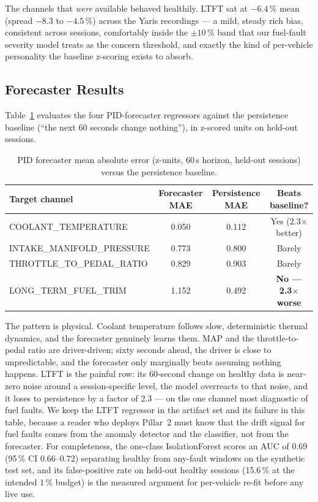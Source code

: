 The channels that \emph{were} available behaved healthily. LTFT sat at
$-6.4\,\%$ mean (spread $-8.3$ to $-4.5\,\%$) across the Yaris recordings
--- a mild, steady rich bias, consistent across sessions, comfortably
inside the $\pm10\,\%$ band that our fuel-fault severity model treats as
the concern threshold, and exactly the kind of per-vehicle personality the
baseline z-scoring exists to absorb.

\subsection{Forecaster Results}
\label{sec:forecastresults}

Table~\ref{tab:forecaster} evaluates the four PID-forecaster regressors
against the persistence baseline (``the next 60 seconds change nothing''),
in z-scored units on held-out sessions.

\begin{table}[H]
  \centering
  \caption{PID forecaster mean absolute error (z-units, 60\,s horizon,
    held-out sessions) versus the persistence baseline.}
  \label{tab:forecaster}
  \begin{tabular}{lccc}
    \toprule
    Target channel & Forecaster MAE & Persistence MAE & Beats baseline?\\
    \midrule
    COOLANT\_TEMPERATURE      & 0.050 & 0.112 & Yes (2.3$\times$ better)\\
    INTAKE\_MANIFOLD\_PRESSURE & 0.773 & 0.800 & Barely\\
    THROTTLE\_TO\_PEDAL\_RATIO & 0.829 & 0.903 & Barely\\
    LONG\_TERM\_FUEL\_TRIM     & 1.152 & 0.492 & \textbf{No --- 2.3$\times$ worse}\\
    \bottomrule
  \end{tabular}
\end{table}

The pattern is physical. Coolant temperature follows slow, deterministic
thermal dynamics, and the forecaster genuinely learns them. MAP and the
throttle-to-pedal ratio are driver-driven; sixty seconds ahead, the driver
is close to unpredictable, and the forecaster only marginally beats
assuming nothing happens. LTFT is the painful row: its 60-second change on
healthy data is near-zero noise around a session-specific level, the model
overreacts to that noise, and it loses to persistence by a factor of 2.3
--- on the one channel most diagnostic of fuel faults. We keep the LTFT
regressor in the artifact set and its failure in this table, because a
reader who deploys Pillar~2 must know that the drift signal for fuel
faults comes from the anomaly detector and the classifier, not from the
forecaster. For completeness, the one-class IsolationForest scores an AUC
of 0.69 (95\,\% CI 0.66--0.72) separating healthy from any-fault windows
on the synthetic test set, and its false-positive rate on held-out healthy
sessions (15.6\,\% at the intended 1\,\% budget) is the measured argument
for per-vehicle re-fit before any live use.

